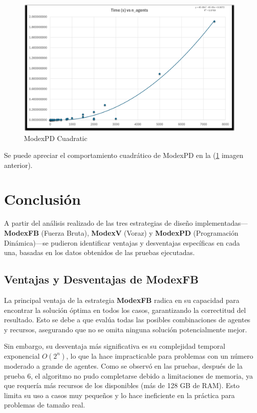 \documentclass[letterpaper,10pt]{article}
\begin{document}
\begin{figure}[H]
  \centering
  \begin{minipage}{1\textwidth}
    \centering
    \includegraphics[width=\textwidth]{Images/modexpdcomplexity.png}
  \end{minipage}
  \caption{ModexPD Cuadratic} 
  \label{fig:modexpdcomplexity}
\end{figure}
Se puede apreciar el comportamiento cuadrático de ModexPD en la (\ref{fig:modexpdcomplexity} imagen anterior).

\section{Conclusión}
\label{sec:conclusion}

A partir del análisis realizado de las tres estrategias de diseño implementadas—\textbf{ModexFB} (Fuerza Bruta), \textbf{ModexV} (Voraz) y \textbf{ModexPD} (Programación Dinámica)—se pudieron identificar ventajas y desventajas específicas en cada una, basadas en los datos obtenidos de las pruebas ejecutadas.

\subsection{Ventajas y Desventajas de ModexFB}

La principal ventaja de la estrategia \textbf{ModexFB} radica en su capacidad para encontrar la solución óptima en todos los casos, garantizando la correctitud del resultado. Esto se debe a que evalúa todas las posibles combinaciones de agentes y recursos, asegurando que no se omita ninguna solución potencialmente mejor.

Sin embargo, su desventaja más significativa es su complejidad temporal exponencial $O(2^n)$, lo que la hace impracticable para problemas con un número moderado a grande de agentes. Como se observó en las pruebas, después de la prueba 6, el algoritmo no pudo completarse debido a limitaciones de memoria, ya que requería más recursos de los disponibles (más de 128 GB de RAM). Esto limita su uso a casos muy pequeños y lo hace ineficiente en la práctica para problemas de tamaño real.
\end{document}
